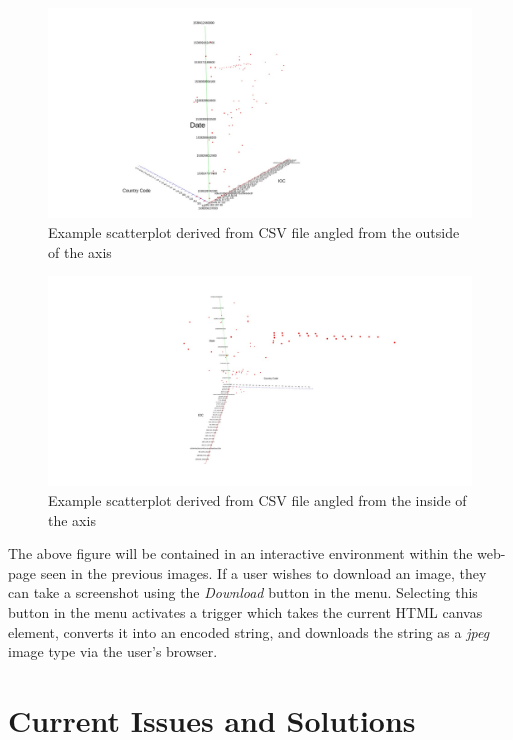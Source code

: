 \documentclass[journal,10pt,onecolumn,compsoc]{IEEEtran} \usepackage[margin=1.0in]{geometry} \usepackage{pdfpages}
\begin{document}
     \begin{figure}[H]
        \centering
        \includegraphics[width=\linewidth]{graphics1.jpeg}
        \caption{Example scatterplot derived from CSV file angled from the outside of the axis}
    \end{figure}
    \begin{figure}[H]
        \centering
        \includegraphics[width=\linewidth]{graphics2.jpeg}
        \caption{Example scatterplot derived from CSV file angled from the inside of the axis}
    \end{figure}
 The above figure will be contained in an interactive environment within the web-page seen in the previous images. If a user wishes to download an image, they can take a screenshot using the \emph{Download} button in the menu. Selecting this button in the menu activates a trigger which takes the current HTML canvas element, converts it into an encoded string, and downloads the string as a \emph{jpeg} image type via the user's browser. 

 \section{Current Issues and Solutions}
\end{document}
